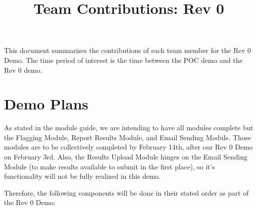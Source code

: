 \documentclass{article}
\title{Team Contributions: Rev 0\\\progname}
\author{\authname}
\date{}
\begin{document}
\maketitle

This document summarizes the contributions of each team member for the Rev 0
Demo.  The time period of interest is the time between the POC demo and the Rev
0 demo.

\section{Demo Plans}


As stated in the module guide, we are intending to have all modules complete but
the Flagging Module, Report Results Module, and Email Sending Module. Those modules
are to be collectively completed by February 14th, after our Rev 0 Demo on February 3rd. 
Also, the Results Upload Module hinges on the Email Sending Module (to make results available to 
submit in the first place), so it's functionality will not be fully realized in this
demo.

Therefore, the following components will be done in their stated order as part of the Rev 0 Demo:
\end{document}

